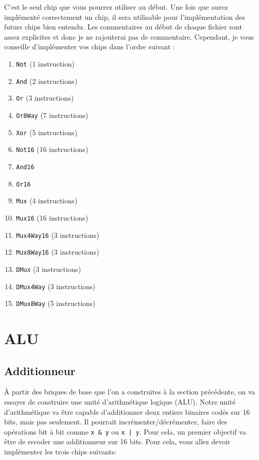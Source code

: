 \documentclass[11pt]{article}
\begin{document}
C'est le seul chip que vous pourrez utiliser au début. Une fois que aurez implémenté correctement un chip, il sera utilisable pour l'implémentation des futurs chips bien entendu. Les commentaires au début de chaque fichier sont assez explicites et donc je ne rajouterai pas de commentaire. Cependant, je vous conseille d'implémenter vos chips dans l'ordre suivant :
\begin{enumerate}
\item \texttt{Not} (1 instruction)
\item \texttt{And} (2 instructions)
\item \texttt{Or} (3 instructions)
\item \texttt{Or8Way} (7 instructions)
\item \texttt{Xor} (5 instructions)
\item \texttt{Not16} (16 instructions)
\item \texttt{And16}
\item \texttt{Or16}
\item \texttt{Mux} (4 instructions)
\item \texttt{Mux16} (16 instructions)
\item \texttt{Mux4Way16} (3 instructions)
\item \texttt{Mux8Way16} (3 instructions)
\item \texttt{DMux} (3 instructions)
\item \texttt{DMux4Way} (3 instructions)
\item \texttt{DMux8Way} (5 instructions)
\end{enumerate}

\section{ALU}
\label{sec:alu}

\subsection*{Additionneur}
À partir des briques de base que l'on a construites à la section précédente, on va essayer de construire une unité d'arithmétique logique (ALU). Notre unité d'arithmétique va être capable d'additionner deux entiers binaires codés sur 16 bits, mais pas seulement. Il pourrait incrémenter/décrémenter, faire des opérations bit à bit comme \texttt{x \& y} ou \texttt{x | y}. Pour cela, un premier objectif va être de recoder une additionneur sur 16 bits. Pour cela, vous allez devoir implémenter les trois chips suivants:
\end{document}
